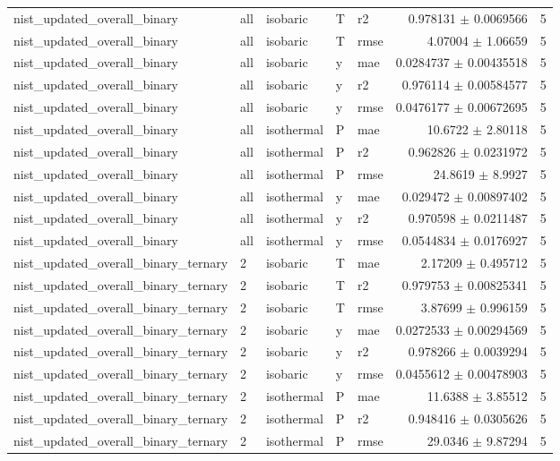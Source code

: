 \begin{tabular}{lllllrr}
nist\_updated\_overall\_binary & all & isobaric & T & r2 & 0.978131 $\pm$ 0.0069566 & 5 \\
nist\_updated\_overall\_binary & all & isobaric & T & rmse & 4.07004 $\pm$ 1.06659 & 5 \\
nist\_updated\_overall\_binary & all & isobaric & y & mae & 0.0284737 $\pm$ 0.00435518 & 5 \\
nist\_updated\_overall\_binary & all & isobaric & y & r2 & 0.976114 $\pm$ 0.00584577 & 5 \\
nist\_updated\_overall\_binary & all & isobaric & y & rmse & 0.0476177 $\pm$ 0.00672695 & 5 \\
nist\_updated\_overall\_binary & all & isothermal & P & mae & 10.6722 $\pm$ 2.80118 & 5 \\
nist\_updated\_overall\_binary & all & isothermal & P & r2 & 0.962826 $\pm$ 0.0231972 & 5 \\
nist\_updated\_overall\_binary & all & isothermal & P & rmse & 24.8619 $\pm$ 8.9927 & 5 \\
nist\_updated\_overall\_binary & all & isothermal & y & mae & 0.029472 $\pm$ 0.00897402 & 5 \\
nist\_updated\_overall\_binary & all & isothermal & y & r2 & 0.970598 $\pm$ 0.0211487 & 5 \\
nist\_updated\_overall\_binary & all & isothermal & y & rmse & 0.0544834 $\pm$ 0.0176927 & 5 \\
nist\_updated\_overall\_binary\_ternary & 2 & isobaric & T & mae & 2.17209 $\pm$ 0.495712 & 5 \\
nist\_updated\_overall\_binary\_ternary & 2 & isobaric & T & r2 & 0.979753 $\pm$ 0.00825341 & 5 \\
nist\_updated\_overall\_binary\_ternary & 2 & isobaric & T & rmse & 3.87699 $\pm$ 0.996159 & 5 \\
nist\_updated\_overall\_binary\_ternary & 2 & isobaric & y & mae & 0.0272533 $\pm$ 0.00294569 & 5 \\
nist\_updated\_overall\_binary\_ternary & 2 & isobaric & y & r2 & 0.978266 $\pm$ 0.0039294 & 5 \\
nist\_updated\_overall\_binary\_ternary & 2 & isobaric & y & rmse & 0.0455612 $\pm$ 0.00478903 & 5 \\
nist\_updated\_overall\_binary\_ternary & 2 & isothermal & P & mae & 11.6388 $\pm$ 3.85512 & 5 \\
nist\_updated\_overall\_binary\_ternary & 2 & isothermal & P & r2 & 0.948416 $\pm$ 0.0305626 & 5 \\
nist\_updated\_overall\_binary\_ternary & 2 & isothermal & P & rmse & 29.0346 $\pm$ 9.87294 & 5 \\

\end{tabular}
